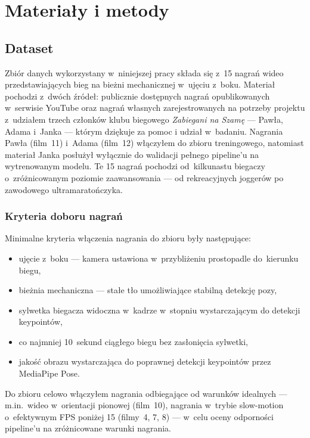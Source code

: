 \chapter{Materiały i metody}
\label{ch:materialy-metody}

\section{Dataset}
\label{sec:dataset}

Zbiór danych wykorzystany w~niniejszej pracy składa się z~15 nagrań wideo przedstawiających bieg na bieżni mechanicznej w~ujęciu z~boku. Materiał pochodzi z~dwóch źródeł: publicznie dostępnych nagrań opublikowanych w~serwisie YouTube oraz nagrań własnych zarejestrowanych na potrzeby projektu z~udziałem trzech członków klubu biegowego \textit{Zabiegani na Szamę} --- Pawła, Adama i~Janka --- którym dziękuje za pomoc i udział w~badaniu. Nagrania Pawła (film~11) i~Adama (film~12) włączyłem do zbioru treningowego, natomiast materiał Janka posłużył wyłącznie do walidacji pełnego pipeline'u na wytrenowanym modelu. Te 15 nagrań pochodzi od~kilkunastu biegaczy o~zróżnicowanym poziomie zaawansowania --- od rekreacyjnych joggerów po zawodowego ultramaratończyka.

\subsection{Kryteria doboru nagrań}
\label{sec:dataset-kryteria}

Minimalne kryteria włączenia nagrania do zbioru były następujące:

\begin{itemize}
    \item ujęcie z~boku  --- kamera ustawiona w~przybliżeniu prostopadle do~kierunku biegu,
    \item bieżnia mechaniczna --- stałe tło umożliwiające stabilną detekcję pozy,
    \item sylwetka biegacza widoczna w~kadrze w~stopniu wystarczającym do detekcji keypointów,
    \item co najmniej 10~sekund ciągłego biegu bez zasłonięcia sylwetki,
    \item jakość obrazu wystarczająca do poprawnej detekcji keypointów przez MediaPipe Pose.
\end{itemize}

Do zbioru celowo włączyłem nagrania odbiegające od warunków idealnych --- m.in.\ wideo w~orientacji pionowej (film~10), nagrania w~trybie slow-motion o~efektywnym FPS poniżej 15 (filmy~4, 7, 8) --- w~celu oceny odporności pipeline'u na zróżnicowane warunki nagrania.

